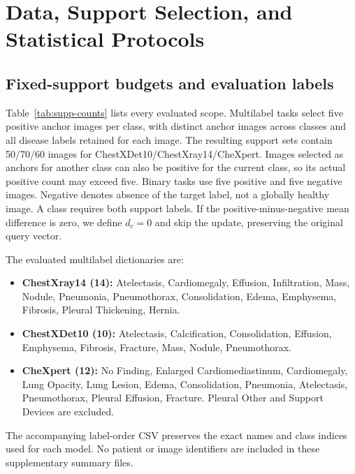 


% 
% 
% 
% 
\clearpage

\section{Data, Support Selection, and Statistical Protocols}
\label{supp:protocol}
\subsection{Fixed-support budgets and evaluation labels}
Table~\ref{tab:supp-counts} lists every evaluated scope. Multilabel tasks select five positive anchor images per class, with distinct anchor images across classes and all disease labels retained for each image. The resulting support sets contain 50/70/60 images for ChestXDet10/ChestXray14/CheXpert. Images selected as anchors for another class can also be positive for the current class, so its actual positive count may exceed five. Binary tasks use five positive and five negative images. Negative denotes absence of the target label, not a globally healthy image. A class requires both support labels. If the positive-minus-negative mean difference is zero, we define $d_c=0$ and skip the update, preserving the original query vector.



The evaluated multilabel dictionaries are:
\begin{itemize}
\item \textbf{ChestXray14 (14):} Atelectasis, Cardiomegaly, Effusion, Infiltration, Mass, Nodule, Pneumonia, Pneumothorax, Consolidation, Edema, Emphysema, Fibrosis, Pleural Thickening, Hernia.
\item \textbf{ChestXDet10 (10):} Atelectasis, Calcification, Consolidation, Effusion, Emphysema, Fibrosis, Fracture, Mass, Nodule, Pneumothorax.
\item \textbf{CheXpert (12):} No Finding, Enlarged Cardiomediastinum, Cardiomegaly, Lung Opacity, Lung Lesion, Edema, Consolidation, Pneumonia, Atelectasis, Pneumothorax, Pleural Effusion, Fracture. Pleural Other and Support Devices are excluded.
\end{itemize}
The accompanying label-order CSV preserves the exact names and class indices used for each model. No patient or image identifiers are included in these supplementary summary files.

